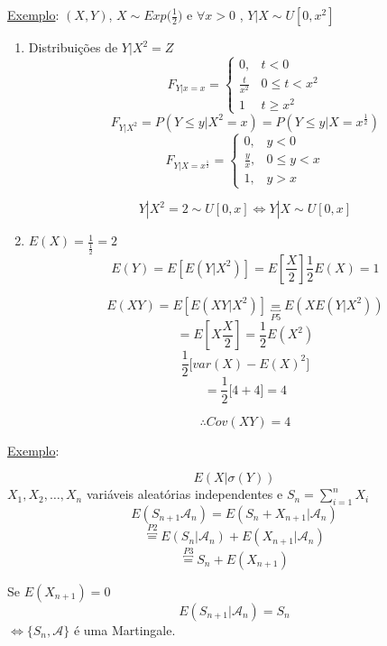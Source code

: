 \documentclass[a4paper,12pt]{article}
\begin{document}
\newpage 


\underline{Exemplo}:
$(X,Y)$,  $X\sim Exp\bigg(\frac{1}{2}\bigg)$ e $\forall x>0$ , $Y|X \sim U[0,x^2]$  

\begin{enumerate}[label=\alph*)]
	\item Distribuições de $Y|X^2=Z$
	$$ 
	F_{Y|x=x}=\begin{cases}
	0, & t<0\\
	\frac{t}{x^2} & 0\le t < x^2\\
	1 & t\ge x^2
	\end{cases}
	$$
	$$F_{Y|X^2} = P(Y\le y| X^2=x)=P(Y\le y|X=x^\frac{1}{2})$$
	$$F_{Y|X=x^\frac{1}{2}}= \begin{cases}
	0, & y<0\\
	\frac{y}{x}, & 0\le y < x\\
	1, & y>x
	\end{cases}
	 $$
	
	 $$Y|X^2=2 \sim  U[0,x] \Leftrightarrow Y|X \sim U[0,x]$$


\item $E(X) = \frac{1}{\frac{1}{2}}=2$
$$E(Y) = E[E(Y|X^2)] = E[\frac{X}{2}] \frac{1}{2}E(X)=1$$

$$E(XY)= E[E(XY|X^2)] \underbracket{=}_{P5} E(XE(Y|X^2))$$
$$=E[X\frac{X}{2}] = \frac{1}{2}E(X^2) $$
$$\frac{1}{2} \bigg[var(X) - E(X)^2 \bigg] $$
$$=\frac{1}{2}\bigg[4+4\bigg]=4 $$

$$\therefore Cov(XY)=4 $$

\end{enumerate}

\newpage 

\underline{Exemplo}:

$$E(X|\sigma(Y)) $$
$X_1,X_2,\ldots,X_n $  variáveis aleatórias independentes e $S_n = \sum\limits_{i=1}^{n}X_i$
$$E(S_{n+1} \mathscr A_n)  = E(S_n+X_{n+1}|\mathscr A_n) $$
$$\overbracket{=}^{P2} E(S_n|\mathscr A_n) + E(X_{n+1}|\mathscr A_n) $$ 
$$\overbracket{=}^{P3}S_n + E(X_{n+1}) $$

Se $E(X_{n+1})=0$
$$E(S_{n+1}|\mathscr A_n) = S_n $$
$\Leftrightarrow \{ S_n,\mathscr A\} $ é uma Martingale.
\end{document}
